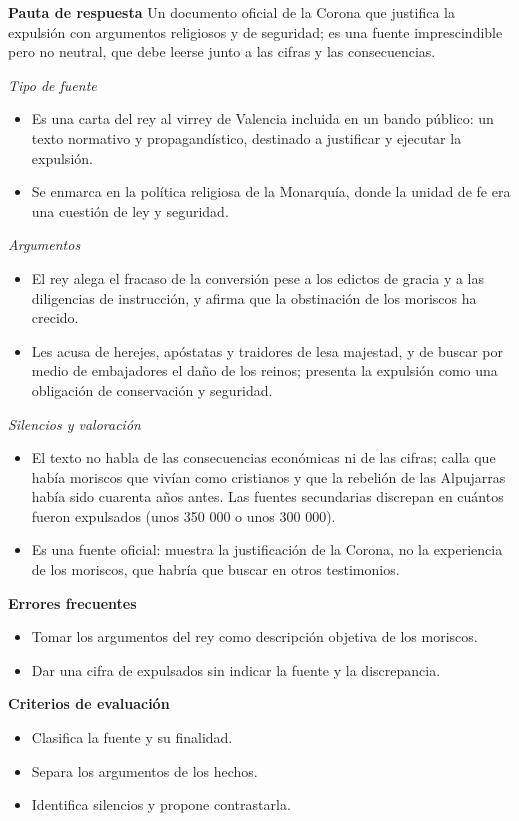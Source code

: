 \documentclass{book}
\begin{document}
\begin{tcolorbox}[title={Ejercicio resuelto}, studiumworked, breakable]
\noindent\textbf{Pauta de respuesta}
Un documento oficial de la Corona que justifica la expulsión con argumentos religiosos y de seguridad; es una fuente imprescindible pero no neutral, que debe leerse junto a las cifras y las consecuencias.


\noindent\textit{Tipo de fuente}
\begin{itemize}
\item Es una carta del rey al virrey de Valencia incluida en un bando público: un texto normativo y propagandístico, destinado a justificar y ejecutar la expulsión.
\item Se enmarca en la política religiosa de la Monarquía, donde la unidad de fe era una cuestión de ley y seguridad.
\end{itemize}

\noindent\textit{Argumentos}
\begin{itemize}
\item El rey alega el fracaso de la conversión pese a los edictos de gracia y a las diligencias de instrucción, y afirma que la obstinación de los moriscos ha crecido.
\item Les acusa de herejes, apóstatas y traidores de lesa majestad, y de buscar por medio de embajadores el daño de los reinos; presenta la expulsión como una obligación de conservación y seguridad.
\end{itemize}

\noindent\textit{Silencios y valoración}
\begin{itemize}
\item El texto no habla de las consecuencias económicas ni de las cifras; calla que había moriscos que vivían como cristianos y que la rebelión de las Alpujarras había sido cuarenta años antes. Las fuentes secundarias discrepan en cuántos fueron expulsados (unos 350 000 o unos 300 000).
\item Es una fuente oficial: muestra la justificación de la Corona, no la experiencia de los moriscos, que habría que buscar en otros testimonios.
\end{itemize}

\noindent\textbf{Errores frecuentes}
\begin{itemize}
\item Tomar los argumentos del rey como descripción objetiva de los moriscos.
\item Dar una cifra de expulsados sin indicar la fuente y la discrepancia.
\end{itemize}

\noindent\textbf{Criterios de evaluación}
\begin{itemize}
\item Clasifica la fuente y su finalidad.
\item Separa los argumentos de los hechos.
\item Identifica silencios y propone contrastarla.
\end{itemize}
\end{tcolorbox}
\end{document}
